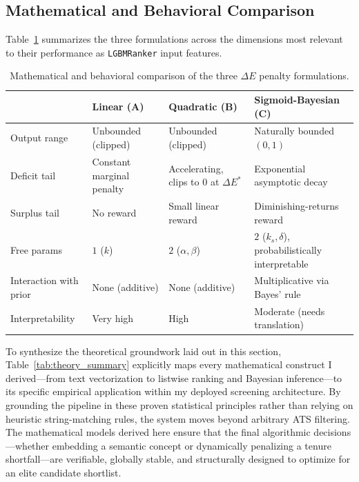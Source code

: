\subsection{Mathematical and Behavioral Comparison}
\label{sec:deltaE_comparison}

Table~\ref{tab:method_comparison_math} summarizes the three formulations across the dimensions most relevant to their performance as \texttt{LGBMRanker} input features.

\begin{table}[H]
    \centering
    \caption{Mathematical and behavioral comparison of the three $\Delta E$ penalty formulations.}
    \label{tab:method_comparison_math}
    \small
    \begin{tabular}{>{\raggedright\arraybackslash}p{2.5cm}>{\raggedright\arraybackslash}p{3.4cm}>{\raggedright\arraybackslash}p{3.4cm}>{\raggedright\arraybackslash}p{3.8cm}}
        \toprule
        & \textbf{Linear (A)} & \textbf{Quadratic (B)} & \textbf{Sigmoid-Bayesian (C)} \\
        \midrule
        Output range & Unbounded (clipped) & Unbounded (clipped) & Naturally bounded $(0,1)$ \\
        Deficit tail & Constant marginal penalty & Accelerating, clips to $0$ at $\Delta E^*$ & Exponential asymptotic decay \\
        Surplus tail & No reward & Small linear reward & Diminishing-returns reward \\
        Free params & $1$ ($k$) & $2$ ($\alpha, \beta$) & $2$ ($k_s, \delta$), probabilistically interpretable \\
        Interaction with prior & None (additive) & None (additive) & Multiplicative via Bayes' rule \\
        Interpretability & Very high & High & Moderate (needs translation) \\
        \bottomrule
    \end{tabular}
\end{table}

To synthesize the theoretical groundwork laid out in this section, Table~\ref{tab:theory_summary} explicitly maps every mathematical construct I derived---from text vectorization to listwise ranking and Bayesian inference---to its specific empirical application within my deployed screening architecture. By grounding the pipeline in these proven statistical principles rather than relying on heuristic string-matching rules, the system moves beyond arbitrary ATS filtering. The mathematical models derived here ensure that the final algorithmic decisions---whether embedding a semantic concept or dynamically penalizing a tenure shortfall---are verifiable, globally stable, and structurally designed to optimize for an elite candidate shortlist.

